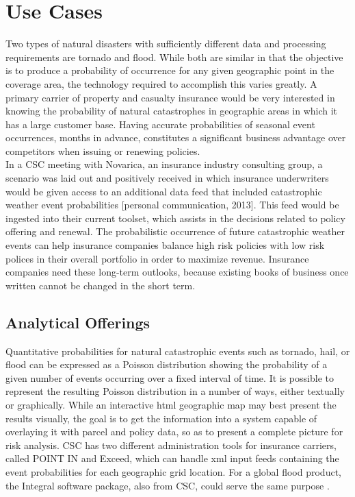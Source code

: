 \section{Use Cases}
Two types of natural disasters with sufficiently different data and processing requirements are tornado and flood. While both are similar in  that the objective is to produce a probability of occurrence for any given geographic point in the coverage area, the technology required to accomplish this varies greatly. A primary carrier of property and casualty insurance would be very interested in knowing the probability of natural catastrophes in geographic areas in which it has a large customer base. Having accurate probabilities of seasonal event occurrences, months in advance, constitutes a significant business advantage over competitors when issuing or renewing policies.\\

In a \textsc{CSC} meeting with Novarica, an insurance industry consulting group, a scenario was laid out and positively received in which insurance underwriters would be given access to an additional data feed that included catastrophic weather event probabilities [personal communication, 2013]. This feed would be ingested into their current toolset, which assists in the decisions related to policy offering and renewal. The probabilistic occurrence of future catastrophic weather events can help insurance companies balance high risk policies with low risk polices in their overall portfolio in order to maximize revenue. Insurance companies need these long-term outlooks, because existing books of business once written cannot be changed in the short term.
\subsection{Analytical Offerings}
Quantitative probabilities for natural catastrophic events such as tornado, hail, or flood can be expressed as a Poisson distribution showing the probability of a given number of events occurring over a fixed interval of time. It is possible to represent the resulting Poisson distribution in a number of ways, either textually or graphically. While an interactive \gls{html} geographic map may best present the results visually, the goal is to get the information into a system capable of overlaying it with parcel and policy data, so as to present a complete picture for risk analysis. \textsc{CSC} has two different administration tools for insurance carriers, called POINT IN and Exceed, which can handle \gls{xml} input feeds containing the event probabilities for each geographic grid location. For a global flood product, the Integral software package, also from \textsc{CSC}, could serve the same purpose \cite{integral}.\\


